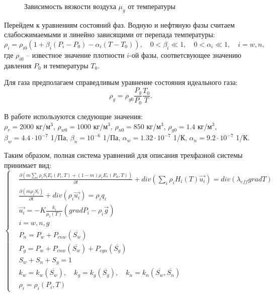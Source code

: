 \begin{figure}[h]
\begin{center}
\caption{Зависимость вязкости воздуха $\mu_g$ от температуры}
\label{tikz_mu_g}
\end{center}
\end{figure}

Перейдем к уравнениям состояний фаз.
Водную и нефтяную фазы считаем слабосжимаемыми и линейно зависящими от перепада температуры:\\
$${\rho}_i = {\rho}_{i0} {(1 + {\beta}_i (P_i-P_0) - {\alpha}_i (T-T_0))},
{\quad}0<{\beta}_{i}{\ll}1,{\quad}0<{\alpha}_{i}{\ll}1,{\quad}i=w,n,$$
где ${\rho}_{i0}$ -- известное значение плотности $i$-ой фазы, соответсвующее
значению давления $P_0$ и температуры $T_0$.

Для газа предполагаем справедливым уравнение состояния идеального
газа:
$${\rho}_g = {\rho}_{g0}{\frac{P_g}{P_0}}{\frac{T_0}{T}}.$$

В работе используются следующие значения:\\
$\rho_r=2000$ кг/м$^3$, $\rho_{w0}=1000$ кг/м$^3$,
$\rho_{n0}=850$ кг/м$^3$, $\rho_{g0}=1.4$ кг/м$^3$,\\
$\beta_w=4.4\cdot10^{-7}$ 1/Па, $\beta_n=10^{-6}$ 1/Па,
$\alpha_w=1.32\cdot10^{-7}$ 1/К, $\alpha_n=9.2\cdot10^{-7}$ 1/К.

Таким образом, полная система уравнений для описания трехфазной системы
принимает вид:
\begin{equation}
\left\{
  \begin{aligned}
    &\frac{\partial \left(m {\sum\limits_{i}{\rho_i S_i E_i(P_i, T)}} + (1-m){\rho_r E_r(P_w, T)}\right)}{\partial t}
      + div(\sum_{i}{\rho_i H_i(T) \overrightarrow{u_i}}) = div(\lambda_{eff} grad T) \\
    &\frac{\partial (m \rho_i S_i)}{\partial t}+ div(\rho_i \overrightarrow{u_i}) = \rho_i q_i \\
    &\overrightarrow{u_i}=-K \frac{k_i}{{\mu_i(T)}}(grad P_i - {\rho}_i\overrightarrow{g})\\
    &i=w,n,g\\
    &P_n=P_w+P_{cnw}(\overline{S_w})\\
    &P_g=P_w+P_{cnw}(\overline{S_w})+P_{cgn}(\overline{S_g})\\
    &S_w + S_n + S_g=1\\
    &k_w=k_w(\overline{S_w}),\quad k_g=k_g(\overline{S_g}),\quad k_n=k_n(\overline{S_w},\overline{S_n})\\
    &\rho_i=\rho_i(P_i,T)
  \end{aligned}
\right.
\end{equation}

